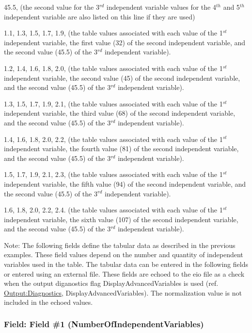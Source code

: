 45.5, (the second value for the 3\(^{rd}\) independent variable values for the 4\(^{th}\) and 5\(^{th}\) independent variable are also listed on this line if they are used)

1.1, 1.3, 1.5, 1.7, 1.9, (the table values associated with each value of the 1\(^{st}\) independent variable, the first value (32) of the second independent variable, and the second value (45.5) of the 3\(^{rd}\) independent variable).

1.2, 1.4, 1.6, 1.8, 2.0, (the table values associated with each value of the 1\(^{st}\) independent variable, the second value (45) of the second independent variable, and the second value (45.5) of the 3\(^{rd}\) independent variable).

1.3, 1.5, 1.7, 1.9, 2.1, (the table values associated with each value of the 1\(^{st}\) independent variable, the third value (68) of the second independent variable, and the second value (45.5) of the 3\(^{rd}\) independent variable).

1.4, 1.6, 1.8, 2.0, 2.2, (the table values associated with each value of the 1\(^{st}\) independent variable, the fourth value (81) of the second independent variable, and the second value (45.5) of the 3\(^{rd}\) independent variable).

1.5, 1.7, 1.9, 2.1, 2.3, (the table values associated with each value of the 1\(^{st}\) independent variable, the fifth value (94) of the second independent variable, and the second value (45.5) of the 3\(^{rd}\) independent variable).

1.6, 1.8, 2.0, 2.2, 2.4. (the table values associated with each value of the 1\(^{st}\) independent variable, the sixth value (107) of the second independent variable, and the second value (45.5) of the 3\(^{rd}\) independent variable).

Note: The following fields define the tabular data as described in the previous examples. These field values depend on the number and quantity of independent variables used in the table. The tabular data can be entered in the following fields or entered using an external file. These fields are echoed to the eio file as a check when the output diganostics flag DisplayAdvancedVariables is used (ref. \hyperref[outputdiagnostics]{Output:Diagnostics}, DisplayAdvancedVariables). The normalization value is not included in the echoed values.

\subsubsection{Field: Field \#1 (NumberOfIndependentVariables)}\label{field-field-1-numberofindependentvariables}

